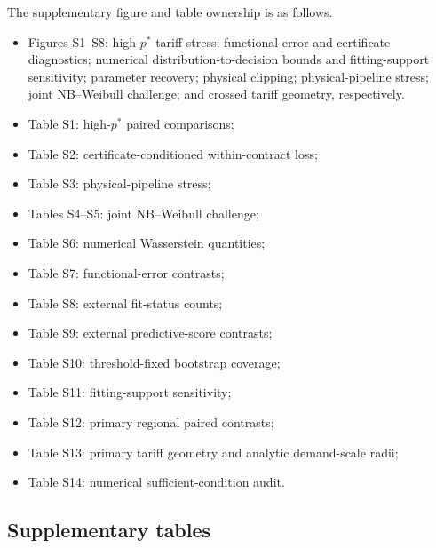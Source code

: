 \documentclass[AMA,Times1COL]{WileyNJDv5}
\begin{document}
The supplementary figure and table ownership is as follows.
\begin{itemize}
\item Figures S1--S8: high-$p^*$ tariff stress; functional-error and
certificate diagnostics; numerical distribution-to-decision bounds
and fitting-support sensitivity; parameter recovery; physical clipping;
physical-pipeline stress; joint NB--Weibull challenge; and crossed
tariff geometry, respectively.
\item Table S1: high-$p^*$ paired comparisons;
\item Table S2: certificate-conditioned within-contract loss;
\item Table S3: physical-pipeline stress;
\item Tables S4--S5: joint NB--Weibull challenge;
\item Table S6: numerical Wasserstein quantities;
\item Table S7: functional-error contrasts;
\item Table S8: external fit-status counts;
\item Table S9: external predictive-score contrasts;
\item Table S10: threshold-fixed bootstrap coverage;
\item Table S11: fitting-support sensitivity;
\item Table S12: primary regional paired contrasts;
\item Table S13: primary tariff geometry and analytic demand-scale radii;
\item Table S14: numerical sufficient-condition audit.
\end{itemize}\clearpage

\clearpage
\subsection*{Supplementary tables}


\FloatBarrier


\FloatBarrier


\FloatBarrier


\FloatBarrier


\FloatBarrier


\FloatBarrier


\FloatBarrier


\FloatBarrier
\end{document}
